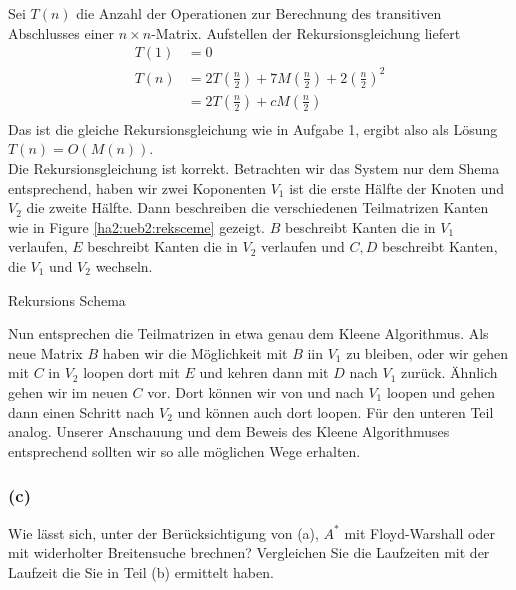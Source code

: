 \documentclass[11pt,a4paper,ngerman]{article}
\begin{document}
Sei $T(n)$ die Anzahl der Operationen zur Berechnung des transitiven Abschlusses einer $n \times n$-Matrix.
Aufstellen der Rekursionsgleichung liefert
\begin{equation*}\begin{split}
T(1) &= 0 \\
T(n) &= 2T\left(\frac{n}{2} \right) + 7M(\frac{n}{2}) + 2\left(\frac{n}{2}\right)^2 \\
     &= 2T\left(\frac{n}{2} \right) + cM(\frac{n}{2})  \\
\end{split}\end{equation*}
Das ist die gleiche Rekursionsgleichung wie in Aufgabe 1, ergibt also als Lösung $T(n) = O(M(n))$. \\

Die Rekursionsgleichung ist korrekt. Betrachten wir das System nur dem Shema entsprechend, haben wir zwei Koponenten
$V_1$ ist die erste Hälfte der Knoten und $V_2$ die zweite Hälfte. Dann beschreiben die verschiedenen Teilmatrizen
Kanten wie in Figure \ref{ha2:ueb2:reksceme} gezeigt. $B$ beschreibt Kanten die in $V_1$ verlaufen, $E$ beschreibt Kanten die in $V_2$ verlaufen
und $C,D$ beschreibt Kanten, die $V_1$ und $V_2$ wechseln.

\begin{table}[h!]
    \centering
    \caption{Rekursions Schema}
    \label{ha2:ueb2:reksceme}
\end{table}

Nun entsprechen die Teilmatrizen in etwa genau dem Kleene Algorithmus. Als neue Matrix $B$ haben wir die Möglichkeit mit $B$ iin $V_1$ zu bleiben,
oder wir gehen mit $C$ in $V_2$ loopen dort mit $E$ und kehren dann mit $D$ nach $V_1$ zurück. Ähnlich gehen wir im neuen $C$ vor. Dort können wir von
und nach $V_1$ loopen und gehen dann einen Schritt nach $V_2$ und können auch dort loopen. Für den unteren Teil analog. Unserer Anschauung und dem Beweis
des Kleene Algorithmuses entsprechend sollten wir so alle möglichen Wege erhalten.
\subsubsection*{(c)}
Wie lässt sich, unter der Berücksichtigung von (a), $A^*$ mit Floyd-Warshall oder mit widerholter Breitensuche brechnen?
Vergleichen Sie die Laufzeiten mit der Laufzeit die Sie in Teil (b) ermittelt haben.\\
\end{document}
